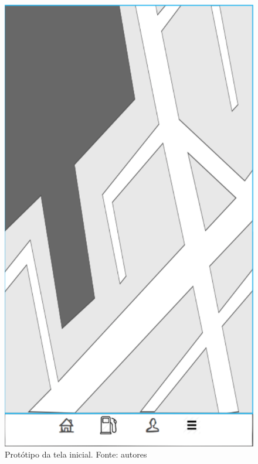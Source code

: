 \begin{figure}[H]
    \centering
    \includegraphics[scale=0.5]{figuras/prototipo_mapa.png}
    \caption[Protótipo da tela inicial]{Protótipo da tela inicial. Fonte: autores}
    \label{img:prototipo_tela_inicial}
\end{figure}
